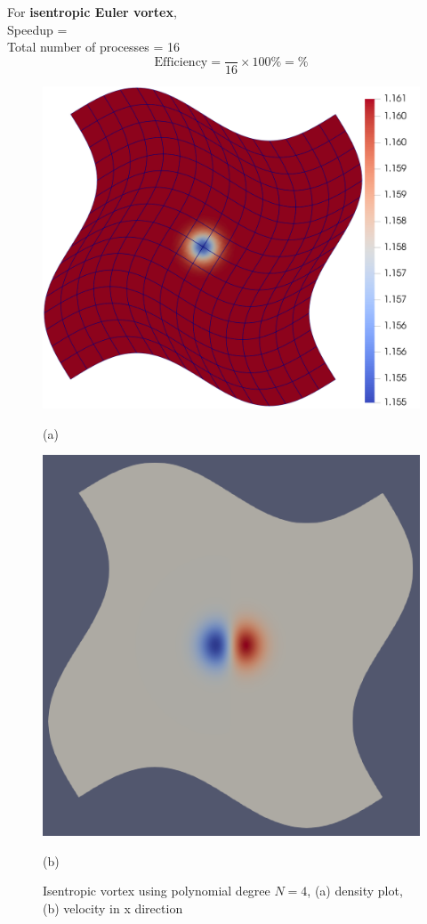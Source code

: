 \hspace{-18pt}For \textbf{isentropic Euler vortex},\\
Speedup = \\
Total number of processes = 16
\begin{equation*}
    \text{Efficiency} = \frac{}{16} \times 100 \% =  \%   
\end{equation*}
\begin{figure}[!ht]
    \centering
    \begin{minipage}{0.5\textwidth}
        \centering
        \includegraphics[width=0.9\linewidth]{attachments/isentropic_arpit.png}
        \caption*{(a)}
    \end{minipage}%
    \begin{minipage}{0.5\textwidth}
        \centering
        \includegraphics[width=0.9\linewidth]{attachments/solution_068877_vx.png}
        \caption*{(b)}
    \end{minipage}
    \caption{Isentropic vortex using polynomial degree $N = 4$, (a) density plot, (b) velocity in x direction}
\end{figure}

